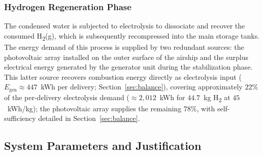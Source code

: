 \documentclass[applsci,article,submit,pdftex,moreauthors]{Definitions/mdpi}
\begin{document}
\subsubsection{Hydrogen Regeneration Phase}
The condensed water is subjected to electrolysis to dissociate and recover the consumed H\textsubscript{2}(g), which is subsequently recompressed into the main storage tanks. The energy demand of this process is supplied by two redundant sources: the photovoltaic array installed on the outer surface of the airship and the surplus electrical energy generated by the generator unit during the stabilization phase. This latter source recovers combustion energy directly as electrolysis input ($E_\text{gen} \approx 447$~kWh per delivery; Section~\ref{sec:balance}), covering approximately $22\%$ of the per-delivery electrolysis demand (${\approx}2{,}012$~kWh for $44.7$~kg H\textsubscript{2} at $45$~kWh/kg); the photovoltaic array supplies the remaining $78\%$, with self-sufficiency detailed in Section~\ref{sec:balance}.

\subsection{System Parameters and Justification}
\label{sec:params}
\end{document}
